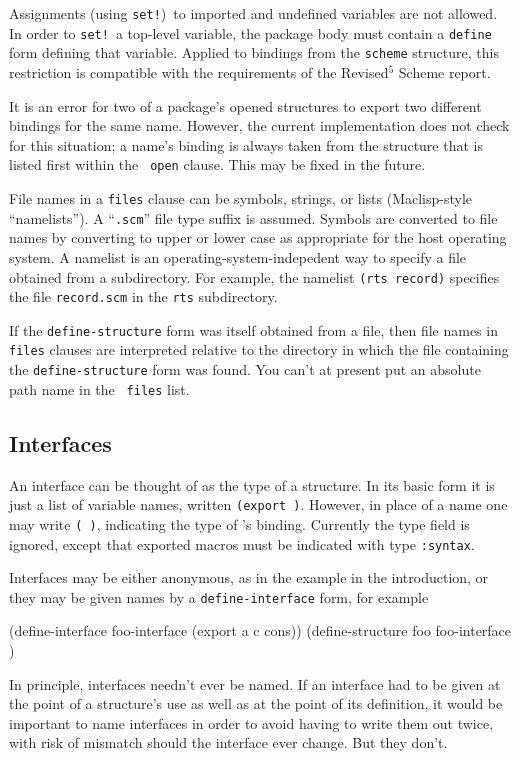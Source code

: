 Assignments (using {\tt set!})\ to imported and undefined variables
are not allowed.  In order to {\tt set!}\ a top-level variable, the
package body must contain a {\tt define} form defining that variable.
Applied to bindings from the {\tt scheme} structure, this restriction
is compatible with the requirements of the Revised$^5$ Scheme report.

It is an error for two of a package's opened structures to export two
different bindings for the same name.  However, the current
implementation does not check for this situation; a name's binding is
always taken from the structure that is listed first within the {\tt
open} clause.  This may be fixed in the future.

File names in a {\tt files} clause can be symbols, strings, or lists
(Maclisp-style ``namelists'').  A ``{\tt.scm}'' file type suffix is
assumed.  Symbols are converted to file names by converting to upper
or lower case as appropriate for the host operating system.  A
namelist is an operating-system-indepedent way to specify a file
obtained from a subdirectory.  For example, the namelist {\tt(rts
record)} specifies the file {\tt record.scm} in the {\tt rts}
subdirectory.

If the {\tt define-structure} form was itself obtained from a file,
then file names in {\tt files} clauses are interpreted relative to the
directory in which the file containing the {\tt define-structure} form
was found.  You can't at present put an absolute path name in the {\tt
files} list.


\subsection*{Interfaces}

An interface can be thought of as the type of a structure.  In its
basic form it is just a list of variable names, written {\tt(export
 \etc)}.  However, in place of
a name one may write {\tt( )}, indicating the type
of 's binding.  Currently the type field is ignored, except
that exported macros must be indicated with type {\tt :syntax}.

Interfaces may be either anonymous, as in the example in the
introduction, or they may be given names by a {\tt define-interface}
form, for example
\begin{code}
    (define-interface foo-interface (export a c cons))
    (define-structure foo foo-interface \etc)
\end{code}
In principle, interfaces needn't ever be named.  If an interface
had to be given at the point of a structure's use as well as at the
point of its definition, it would be important to name interfaces in
order to avoid having to write them out twice, with risk of mismatch
should the interface ever change.  But they don't.

